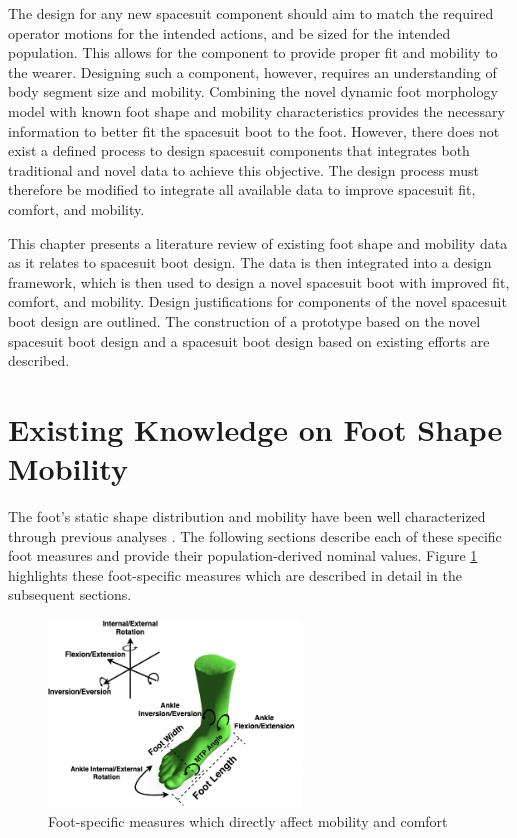 \documentclass[defaultstyle,11pt]{thesis}
\begin{document}
The design for any new spacesuit component should aim to match the required operator motions for the intended actions, and be sized for the intended population.
This allows for the component to provide proper fit and mobility to the wearer.
Designing such a component, however, requires an understanding of body segment size and mobility.
Combining the novel dynamic foot morphology model with known foot shape and mobility characteristics provides the necessary information to better fit the spacesuit boot to the foot.
However, there does not exist a defined process to design spacesuit components that integrates both traditional and novel data to achieve this objective.
The design process must therefore be modified to integrate all available data to improve spacesuit fit, comfort, and mobility.

This chapter presents a literature review of existing foot shape and mobility data as it relates to spacesuit boot design.
The data is then integrated into a design framework, which is then used to design a novel spacesuit boot with improved fit, comfort, and mobility.
Design justifications for components of the novel spacesuit boot design are outlined.
The construction of a prototype based on the novel spacesuit boot design and a spacesuit boot design based on existing efforts are described.

\hypertarget{existing-knowledge-on-foot-shape-mobility}{%
\section{Existing Knowledge on Foot Shape Mobility}\label{existing-knowledge-on-foot-shape-mobility}}

The foot's static shape distribution and mobility have been well characterized through previous analyses \citep{Farris2019, Mann1979, Voloshina2013, Wannop2014}.
The following sections describe each of these specific foot measures and provide their population-derived nominal values.
Figure \ref{fig:SA3-Foot} highlights these foot-specific measures which are described in detail in the subsequent sections.

\begin{figure}
\hypertarget{fig:SA3-Foot}{%
\centering
\includegraphics[width=0.6\textwidth,height=\textheight]{../fig/SA3/FootOverview.png}
\caption{Foot-specific measures which directly affect mobility and comfort}\label{fig:SA3-Foot}
}
\end{figure}
\end{document}
